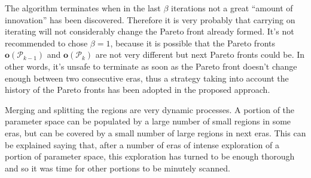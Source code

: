\begin{rem}
\label{rem:termination}The algorithm terminates when in the last
$\beta$ iterations not a great ``amount of innovation'' has been
discovered. Therefore it is very probably that carrying on iterating
will not considerably change the Pareto front already formed. It's
not recommended to chose $\beta=1$, because it is possible that the
Pareto fronts $\mathbf{o}\left(\mathscr{P}_{k-1}\right)$ and $\mathbf{o}\left(\mathscr{P}_{k}\right)$
are not very different but next Pareto fronts could be. In other words,
it's unsafe to terminate as soon as the Pareto front doesn't change
enough between two consecutive eras, thus a strategy taking into
account the history of the Pareto fronts has been adopted in the
proposed approach.
\end{rem}


\begin{rem}
Merging and splitting the regions are very dynamic processes. A portion
of the parameter space can be populated by a large number of small
regions in some eras, but can be covered by a small number of large
regions in next eras. This can be explained saying that, after a number
of eras of intense exploration of a portion of parameter space, this
exploration has turned to be enough thorough and so it was time for
other portions to be minutely scanned.
\end{rem}
